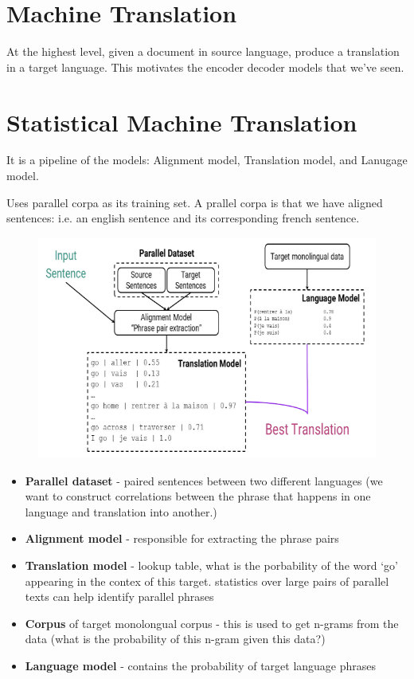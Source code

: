\documentclass[11pt]{article}
\begin{document}


\tableofcontents

\clearpage

\section{Machine Translation}

At the highest level, given a document in source language, produce a translation in a target language. This motivates the encoder decoder models that we've seen.

\section{Statistical Machine Translation}

It is a pipeline of the models: Alignment model, Translation model, and Lanugage model.

Uses parallel corpa as its training set. A prallel corpa is that we have aligned sentences: i.e. an english sentence and its corresponding french sentence.

\begin{figure}[H]
    \centering
    \includegraphics*[width=.6\linewidth]{figures/smt-idea.png}
\end{figure}

\begin{itemize}
    \item \textbf{Parallel dataset} - paired sentences between two different languages (we want to construct correlations between the phrase that happens in one language and translation into another.)
    \item \textbf{Alignment model} - responsible for extracting the phrase pairs    
    \item \textbf{Translation model} - lookup table, what is the porbability of the word `go' appearing in the contex of this target. statistics over large pairs of parallel texts can
    help identify parallel phrases
    \item \textbf{Corpus} of target monolongual corpus - this is used to get n-grams from the data (what is the probability of this n-gram given this data?)
    \item \textbf{Language model} - contains the probability of target language phrases 
\end{itemize}
\end{document}
